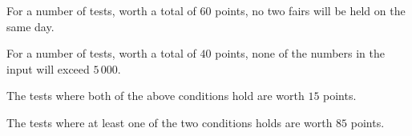 For a number of tests, worth a total of $60$ points, no two fairs will be held on the same day.

For a number of tests, worth a total of $40$ points, none of the numbers in the input will exceed $5\,000$.

The tests where both of the above conditions hold are worth $15$ points.

The tests where at least one of the two conditions holds are worth $85$ points.
